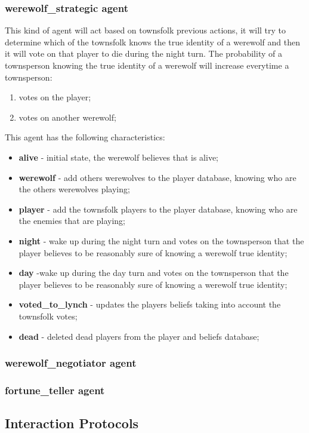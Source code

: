 \documentclass{article}
\begin{document}
\subsubsection{werewolf\_strategic agent}
This kind of agent will act based on townsfolk previous actions, it will try to determine which of the townsfolk knows the true identity of a werewolf and then it will vote on that player to die during the night turn.
The probability of a townsperson knowing the true identity of a werewolf will increase everytime a townsperson:
\begin{enumerate}
	\item votes on the player;
	\item votes on another werewolf;
\end{enumerate}
This agent has the following characteristics:
\begin{itemize}
	\item \textbf{alive} - initial state, the werewolf believes that is alive;
	\item \textbf{werewolf} - add others werewolves to the player database, knowing who are the others werewolves playing;
	\item \textbf{player} - add the townsfolk players to the player database, knowing who are the enemies that are playing;
	\item \textbf{night} - wake up during the night turn and votes on the townsperson that the player believes to be reasonably sure of knowing a werewolf true identity;
	\item \textbf{day} -wake up during the day turn and votes on the townsperson that the player believes to be reasonably sure of knowing a werewolf true identity;
	\item \textbf{voted\_to\_lynch} - updates the players beliefs taking into account the townsfolk votes;
	\item \textbf{dead} - deleted dead players from the player and beliefs database;
\end{itemize}
\subsubsection{werewolf\_negotiator agent}

\subsubsection{fortune\_teller agent}
\subsection{Interaction Protocols}
\end{document}
